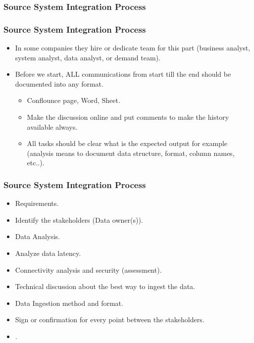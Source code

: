 \subsubsection{Source System Integration Process}
\begin{frame}
\frametitle{Source System Integration Process}
\begin{itemize}
\item In some companies they hire or dedicate team for this part (business analyst, system analyst, data analyst, or demand team).
\item Before we start, ALL communications from start till the end should be documented into any format.
	\begin{itemize}
		\item  Conflounce page, Word, Sheet.
		\item  Make the discussion online and put comments to make the history available always.
		\item  All tasks should be clear what is the expected output for example (analysis means to document data structure, format, column names, etc..).
	\end{itemize}
\end{itemize}

\end{frame}

\begin{frame}
\frametitle{Source System Integration Process}
\begin{itemize}
	
	\item  Requirements. %
	\item  Identify the stakeholders (Data owner(s)).
	\item  Data Analysis.
	\item  Analyze data latency.
	\item  Connectivity analysis and security (assessment).
	\item  Technical discussion about the best way to ingest the data.
	\item  Data Ingestion method and format.
	\item  Sign or confirmation for every point between the stakeholders.
	\item  {}.
\end{itemize}

\end{frame}


